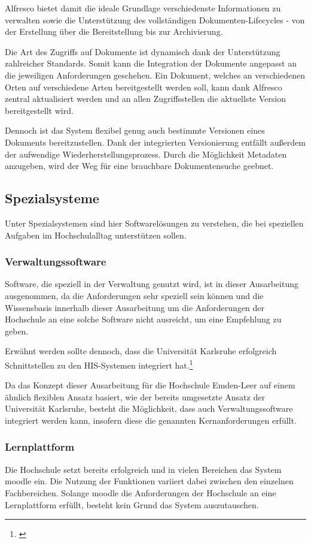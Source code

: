 Alfresco bietet damit die ideale Grundlage verschiedenste Informationen zu verwalten sowie die Unterstützung des vollständigen Dokumenten-Lifecycles - von der Erstellung über die Bereitstellung bis zur Archivierung. 

Die Art des Zugriffs auf Dokumente ist dynamisch dank der Unterstützung zahlreicher Standards. Somit kann die Integration der Dokumente angepasst an die jeweiligen Anforderungen geschehen. Ein Dokument, welches an verschiedenen Orten auf verschiedene Arten bereitgestellt werden soll, kann dank Alfresco zentral aktualisiert werden und an allen Zugriffsstellen die aktuellste Version bereitgestellt wird.

Dennoch ist das System flexibel genug auch bestimmte Versionen eines Dokuments bereitzustellen. Dank der integrierten Versionierung entfällt außerdem der aufwendige Wiederherstellungsprozess. Durch die Möglichkeit Metadaten anzugeben, wird der Weg für eine brauchbare Dokumentensuche geebnet.

\subsection{Spezialsysteme}
Unter Spezialsystemen sind hier Softwarelösungen zu verstehen, die bei speziellen Aufgaben im Hochschulalltag unterstützen sollen.

\subsubsection{Verwaltungssoftware}
Software, die speziell in der Verwaltung genutzt wird, ist in dieser Ausarbeitung ausgenommen, da die Anforderungen sehr speziell sein können und die Wissensbasis innerhalb dieser Ausarbeitung um die Anforderungen der Hochschule an eine solche Software nicht ausreicht, um eine Empfehlung zu geben.

Erwähnt werden sollte dennoch, dass die Universität Karlsruhe erfolgreich Schnittstellen zu den HIS-Systemen integriert hat.\footnote{\cite{dini_webportale_2007}}

Da das Konzept dieser Ausarbeitung für die Hochschule Emden-Leer auf einem ähnlich flexiblen Ansatz basiert, wie der bereits umgesetzte Ansatz der Universität Karlsruhe, besteht die Möglichkeit, dass auch Verwaltungssoftware integriert werden kann, insofern diese die genannten Kernanforderungen erfüllt.

\subsubsection{Lernplattform}
Die Hochschule setzt bereits erfolgreich und in vielen Bereichen das System moodle ein. Die Nutzung der Funktionen variiert dabei zwischen den einzelnen Fachbereichen.
Solange moodle die Anforderungen der Hochschule an eine Lernplattform erfüllt, besteht kein Grund das System auszutauschen.


